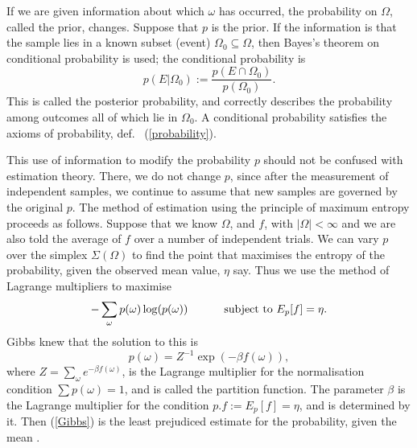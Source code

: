 \documentclass[12pt]{article}
\begin{document}
If we are given information about which $\omega$ has occurred, the
probability on $\Omega$, called the prior, changes. Suppose that $p$ is
the prior. If the information is that the sample lies in a known subset
(event) $\Omega_0\subseteq\Omega$, then Bayes's theorem on conditional
probability is used; the conditional probability is
\begin{equation}
p(E|\Omega_0):=\frac{p(E\cap\Omega_0)}{p(\Omega_0)}.
\end{equation}
This is called the posterior probability, and correctly describes the
probability among outcomes all of which lie in $\Omega_0$. A conditional
probability satisfies the axioms of probability, def.~ (\ref{probability}).

This use of information to modify the probability $p$ should not
be confused with estimation theory. There, we do not change $p$, since
after the measurement of independent samples, we continue to assume that
new samples are governed by the original $p$.
The method of estimation using the principle of maximum entropy proceeds
as follows. Suppose that we
know $\Omega$, and $f$, with $|\Omega|<\infty$ and we are also told the
average of $f$ over a number of independent trials.
We can vary $p$ over the simplex $\Sigma(\Omega)$ to find the
point that maximises the entropy of the probability, given the observed
mean value, $\eta$ say. Thus we use the method of Lagrange multipliers to
maximise
\[-\sum_\omega p(\omega)\log(p(\omega))\hspace{.4in}
\mbox{ subject to }E_p[f]=\eta.\]
Gibbs knew that the solution to this is
\begin{equation}
p(\omega)=Z^{-1}\exp(-\beta f(\omega)),
\label{Gibbs}
\end{equation}
where $Z=\sum_\omega e^{-\beta f(\omega)}$, is the Lagrange multiplier for
the normalisation condition $\sum p(\omega)=1$, and is called the
partition function. The parameter $\beta$ is the Lagrange multiplier for
the condition $p.f:=E_p[f]=\eta$, and is determined by it. Then (\ref{Gibbs})
is the least prejudiced estimate for the probability, given the mean
\cite{Ingarden,Jaynes}.
\end{document}
